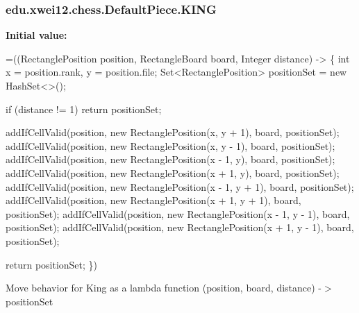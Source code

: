 \subsubsection[{\texorpdfstring{K\+I\+NG}{KING}}]{\setlength{\rightskip}{0pt plus 5cm}edu.\+xwei12.\+chess.\+Default\+Piece.\+K\+I\+NG}\hypertarget{enumedu_1_1xwei12_1_1chess_1_1_default_piece_acfcc57b23edd8c55a27ccde783903fdd}{}\label{enumedu_1_1xwei12_1_1chess_1_1_default_piece_acfcc57b23edd8c55a27ccde783903fdd}
{\bfseries Initial value\+:}
\begin{DoxyCode}
=((RectanglePosition position, RectangleBoard board, Integer distance) -> \{
        \textcolor{keywordtype}{int} x = position.rank, y = position.file;
        Set<RectanglePosition> positionSet = \textcolor{keyword}{new} HashSet<>();

        
        \textcolor{keywordflow}{if} (distance != 1) \textcolor{keywordflow}{return} positionSet;

        
        addIfCellValid(position, \textcolor{keyword}{new} RectanglePosition(x, y + 1), board, positionSet);
        addIfCellValid(position, \textcolor{keyword}{new} RectanglePosition(x, y - 1), board, positionSet);
        addIfCellValid(position, \textcolor{keyword}{new} RectanglePosition(x - 1, y), board, positionSet);
        addIfCellValid(position, \textcolor{keyword}{new} RectanglePosition(x + 1, y), board, positionSet);
        addIfCellValid(position, \textcolor{keyword}{new} RectanglePosition(x - 1, y + 1), board, positionSet);
        addIfCellValid(position, \textcolor{keyword}{new} RectanglePosition(x + 1, y + 1), board, positionSet);
        addIfCellValid(position, \textcolor{keyword}{new} RectanglePosition(x - 1, y - 1), board, positionSet);
        addIfCellValid(position, \textcolor{keyword}{new} RectanglePosition(x + 1, y - 1), board, positionSet);

        \textcolor{keywordflow}{return} positionSet;
    \})
\end{DoxyCode}
Move behavior for King as a lambda function (position, board, distance) -\/$>$ position\+Set 
